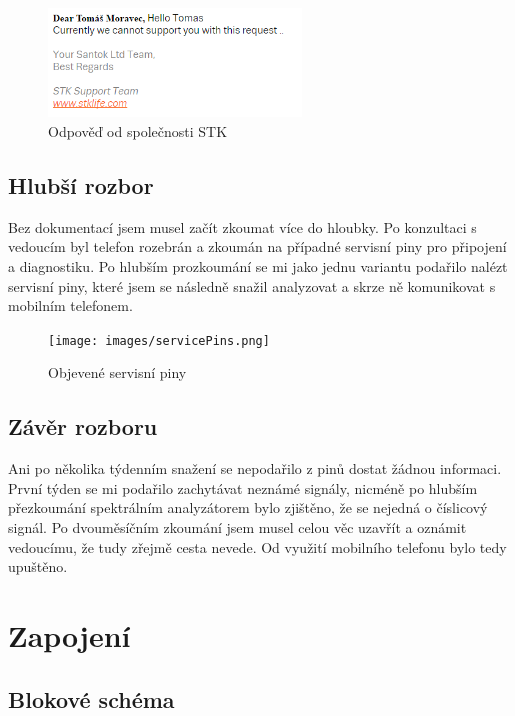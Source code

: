 \documentclass[FM,DP]{tulthesis}  %
\begin{document}
\begin{figure}[H]
\begin{center}
\includegraphics[width=0.6\textwidth]{images/response.png}
\caption{Odpověď od společnosti STK}
\label{image}
\end{center}
\end{figure}

\subsection{Hlubší rozbor}
Bez dokumentací jsem musel začít zkoumat více do hloubky. Po konzultaci s vedoucím byl telefon rozebrán a zkoumán na případné servisní piny pro připojení a diagnostiku. Po hlubším prozkoumání se mi jako jednu variantu podařilo nalézt servisní piny, které jsem se následně snažil analyzovat a skrze ně komunikovat s mobilním telefonem.

\begin{figure}[H]
\begin{center}
\texttt{[image: images/servicePins.png]}
\caption{Objevené servisní piny}
\label{image}
\end{center}
\end{figure}

\subsection{Závěr rozboru}
Ani po několika týdenním snažení se nepodařilo z pinů dostat žádnou informaci. První týden se mi podařilo zachytávat neznámé signály, nicméně po hlubším přezkoumání spektrálním  analyzátorem bylo zjištěno, že se nejedná o číslicový signál. Po dvouměsíčním zkoumání jsem musel celou věc uzavřít a oznámit vedoucímu, že tudy zřejmě cesta nevede. Od využití mobilního telefonu bylo tedy upuštěno.

\section{Zapojení}

\subsection{Blokové schéma}
\end{document}
